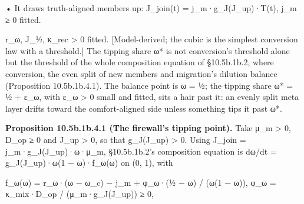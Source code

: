 \documentclass[
]{article}
\begin{document}
• It draws truth-aligned members up: J\_join(t) = j\_m·g\_J(J\_up)·T(t),
j\_m ≥ 0 fitted.

r\_ω, J\_½, κ\_rec \textgreater{} 0 fitted. {[}Model-derived; the cubic
is the simplest conversion law with a threshold.{]} The tipping share ω*
is not conversion's threshold alone but the threshold of the whole
composition equation of §10.5b.1b.2, where conversion, the even split of
new members and migration's dilution balance (Proposition 10.5b.1b.4.1).
The balance point is ω = ½; the tipping share ω* = ½ + ε\_ω, with ε\_ω
\textgreater{} 0 small and fitted, sits a hair past it: an evenly split
meta layer drifts toward the comfort-aligned side unless something tips
it past ω*.

\textbf{Proposition 10.5b.1b.4.1 (The firewall's tipping point).} Take
μ\_m \textgreater{} 0, D\_op ≥ 0 and J\_up \textgreater{} 0, so that
g\_J(J\_up) \textgreater{} 0. Using J\_join = j\_m·g\_J(J\_up)·ω·μ\_m,
§10.5b.1b.2's composition equation is dω/dt = g\_J(J\_up)·ω(1 −
ω)·f\_ω(ω) on (0, 1), with

f\_ω(ω) = r\_ω·(ω − ω\_c) − j\_m + φ\_ω·(½ − ω) / (ω(1 − ω)), φ\_ω =
κ\_mix·D\_op / (μ\_m·g\_J(J\_up)) ≥ 0,
\end{document}
